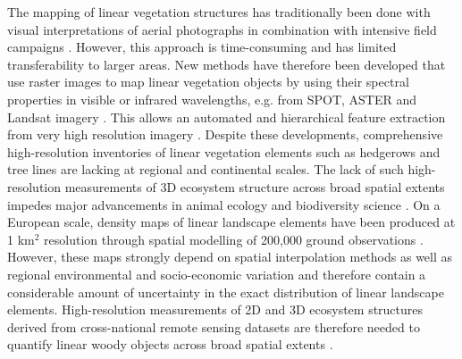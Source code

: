 The mapping of linear vegetation structures has traditionally been done with visual interpretations of aerial photographs in combination with intensive field campaigns \citep{aksoy2010automatic}. However, this approach is time-consuming and has limited transferability to larger areas. New methods have therefore been developed that use raster images to map linear vegetation objects by using their spectral properties in visible or infrared wavelengths, e.g. from SPOT, ASTER and Landsat imagery \citep{thornton2006sub, vannier2014multiscale,tansey2009object}. This allows an automated and hierarchical feature extraction from very high resolution imagery \citep{aksoy2010automatic}. Despite these developments, comprehensive high-resolution inventories of linear vegetation elements such as hedgerows and tree lines are lacking at regional and continental scales. The lack of such high-resolution measurements of 3D ecosystem structure across broad spatial extents impedes major advancements in animal ecology and biodiversity science \citep{kissling2017eecolidar}. On a European scale, density maps of linear landscape elements have been produced at 1 km$^2$ resolution through spatial modelling of 200,000 ground observations \citep{van2013modelling}. However, these maps strongly depend on spatial interpolation methods as well as regional environmental and socio-economic variation and therefore contain a considerable amount of uncertainty in the exact distribution of linear landscape elements. High-resolution measurements of 2D and 3D ecosystem structures derived from cross-national remote sensing datasets are therefore needed to quantify linear woody objects across broad spatial extents \citep{kissling2017eecolidar}.

